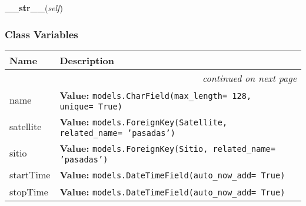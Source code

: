     \label{GroundSegment:models:Pasada:Pasada:__str__}

    \vspace{0.5ex}

\hspace{.8\funcindent}\begin{boxedminipage}{\funcwidth}

    \raggedright \textbf{\_\_str\_\_}(\textit{self})

\setlength{\parskip}{2ex}
\setlength{\parskip}{1ex}
    \end{boxedminipage}



  \subsubsection{Class Variables}

    \vspace{-1cm}
\hspace{\varindent}\begin{longtable}{|p{\varnamewidth}|p{\vardescrwidth}|l}
\cline{1-2}
\cline{1-2} \centering \textbf{Name} & \centering \textbf{Description}& \\
\cline{1-2}
\endhead\cline{1-2}\multicolumn{3}{r}{\small\textit{continued on next page}}\\\endfoot\cline{1-2}
\endlastfoot\raggedright n\-a\-m\-e\- & \raggedright \textbf{Value:} 
{\tt models.CharField(max\_length= 128, unique= True)}&\\
\cline{1-2}
\raggedright s\-a\-t\-e\-l\-l\-i\-t\-e\- & \raggedright \textbf{Value:} 
{\tt models.ForeignKey(Satellite, related\_name= 'pasadas')}&\\
\cline{1-2}
\raggedright s\-i\-t\-i\-o\- & \raggedright \textbf{Value:} 
{\tt models.ForeignKey(Sitio, related\_name= 'pasadas')}&\\
\cline{1-2}
\raggedright s\-t\-a\-r\-t\-T\-i\-m\-e\- & \raggedright \textbf{Value:} 
{\tt models.DateTimeField(auto\_now\_add= True)}&\\
\cline{1-2}
\raggedright s\-t\-o\-p\-T\-i\-m\-e\- & \raggedright \textbf{Value:} 
{\tt models.DateTimeField(auto\_now\_add= True)}&\\
\cline{1-2}
\end{longtable}

